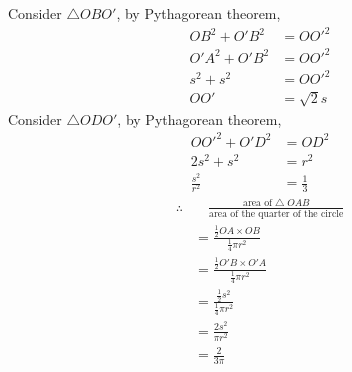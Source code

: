 \documentclass[varwidth=70mm]{standalone}
\begin{document}
\begin{answer}
Consider $\bigtriangleup OBO'$, by Pythagorean theorem,
\begin{equation*}
\begin{aligned}
OB^2 + O'B^2 &= OO'^2 \\
O'A^2 + O'B^2 &= OO'^2 \\
s^2 + s^2 &= OO'^2 \\
OO' &= \sqrt{2}s
\end{aligned}
\end{equation*}
Consider $\bigtriangleup ODO'$, by Pythagorean theorem,
\begin{equation*}
\begin{aligned}
OO'^2 + O'D^2 &= OD^2 \\
2s^2 + s^2 &= r^2 \\
\frac{s^2}{r^2} &= \frac{1}{3}
\end{aligned}
\end{equation*}
\begin{equation*}
\begin{aligned}
\therefore &\quad \frac{\text{area of}\bigtriangleup OAB}{\text{area of the quarter of the circle}} \\
&= \frac{\frac{1}{2}OA\times OB}{\frac{1}{4}\pi r^2} \\
&= \frac{\frac{1}{2}O'B\times O'A}{\frac{1}{4}\pi r^2} \\
&= \frac{\frac{1}{2}s^2}{\frac{1}{4}\pi r^2} \\
&= \frac{2s^2}{\pi r^2} \\
&= \frac{2}{3\pi} \\
\end{aligned}
\end{equation*}
\end{answer}
\end{document}
